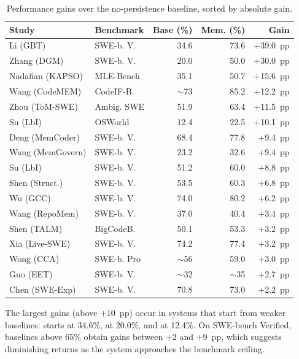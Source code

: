 \begin{table}[htbp]
  \centering
  \caption{Performance gains over the no-persistence baseline, sorted
    by absolute gain.}
  \label{tab:desempenho}
  \begin{tabular}{l l r r r}
    \toprule
    Study & Benchmark & Base (\%) & Mem. (\%) & Gain \\
    \midrule
    Li (GBT) & SWE-b. V. & 34.6 & 73.6 & +39.0~pp \\
    Zhang (DGM) & SWE-b. V. & 20.0 & 50.0 & +30.0~pp \\
    Nadafian (KAPSO) & MLE-Bench & 35.1 & 50.7 & +15.6~pp \\
    Wang (CodeMEM) & CodeIF-B. & $\sim$73 & 85.2 & +12.2~pp \\
    Zhou (ToM-SWE) & Ambig. SWE & 51.9 & 63.4 & +11.5~pp \\
    Su (LbI) & OSWorld & 12.4 & 22.5 & +10.1~pp \\
    Deng (MemCoder) & SWE-b. V. & 68.4 & 77.8 & +9.4~pp \\
    Wang (MemGovern) & SWE-b. V. & 23.2 & 32.6 & +9.4~pp \\
    Su (LbI) & SWE-b. V. & 51.2 & 60.0 & +8.8~pp \\
    Shen (Struct.) & SWE-b. V. & 53.5 & 60.3 & +6.8~pp \\
    Wu (GCC) & SWE-b. V. & 74.0 & 80.2 & +6.2~pp \\
    Wang (RepoMem) & SWE-b. V. & 37.0 & 40.4 & +3.4~pp \\
    Shen (TALM) & BigCodeB. & 50.1 & 53.3 & +3.2~pp \\
    Xia (Live-SWE) & SWE-b. V. & 74.2 & 77.4 & +3.2~pp \\
    Wong (CCA) & SWE-b. Pro & $\sim$56 & 59.0 & +3.0~pp \\
    Guo (EET) & SWE-b. V. & $\sim$32 & $\sim$35 & +2.7~pp \\
    Chen (SWE-Exp) & SWE-b. V. & 70.8 & 73.0 & +2.2~pp \\
    \bottomrule
  \end{tabular}
\end{table}

The largest gains (above +10~pp) occur in systems that start from
weaker baselines:
\citet{li2026traversalaspolicy} starts at 34.6\%,
\citet{zhang2025darwingodel} at 20.0\%, and
\citet{su2025learnbyinteract} at 12.4\%.
On SWE-bench Verified, baselines above 65\% obtain gains between
+2 and +9~pp, which suggests diminishing returns as the system
approaches the benchmark ceiling.

